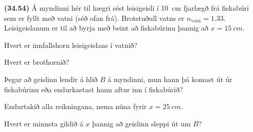 \ifdefined \wholebook \else\documentclass[oneside]{book}\usepackage{EdlBook}\graphicspath{{figures/}}
\begin{document}
\begin{enumerate}[label = \textbf{(\alph*)}]
\begin{minipage}{\linewidth}
\begin{minipage}{\linewidth}
\item[\textbf{(34.54)}] Á myndinni hér til hægri sést leisigeisli í \SI{10}{cm} fjarlægð frá fiskabúri sem er fyllt með vatni (séð ofan frá). Brotstuðull vatns er $n_{\text{vatn}} = \num{1.33}$. Leisigeislanum er til að byrja með beint að fiskabúrinu þannig að $x = \SI{15}{cm}$.  \begin{enumerate*}[label = \textbf{(\alph*)}]
    \item Hvert er innfallshorn leisigeislans í vatnið?
    \item Hvert er brothornið?
    \item Þegar að geislinn lendir á hlið $B$ á myndinni, mun hann þá komast út úr fiskabúrinu eða endurkastast hann aftur inn í fiskabúrið?
    \item Endurtakið alla reikningana, nema núna fyrir $x = \SI{25}{cm}$.
    \item Hvert er minnsta gildið á $x$ þannig að geislinn sleppi út um $B$?
\end{enumerate*}

\end{minipage}

\end{minipage}


\end{enumerate}
\end{document}
